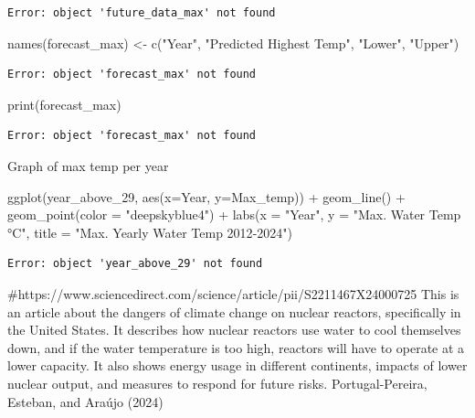 \documentclass[
  letterpaper,
  DIV=11,
  numbers=noendperiod]{scrreprt}
\newenvironment{Shaded}{\begin{snugshade}}{\end{snugshade}}
\newcommand{\AttributeTok}[1]{\textcolor[rgb]{0.40,0.45,0.13}{#1}}
\newcommand{\FunctionTok}[1]{\textcolor[rgb]{0.28,0.35,0.67}{#1}}
\newcommand{\NormalTok}[1]{\textcolor[rgb]{0.00,0.23,0.31}{#1}}
\newcommand{\OtherTok}[1]{\textcolor[rgb]{0.00,0.23,0.31}{#1}}
\newcommand{\SpecialCharTok}[1]{\textcolor[rgb]{0.37,0.37,0.37}{#1}}
\newcommand{\StringTok}[1]{\textcolor[rgb]{0.13,0.47,0.30}{#1}}
\begin{document}
\begin{verbatim}
Error: object 'future_data_max' not found
\end{verbatim}

\begin{Shaded}
\begin{Highlighting}[]
\FunctionTok{names}\NormalTok{(forecast\_max) }\OtherTok{\textless{}{-}} \FunctionTok{c}\NormalTok{(}\StringTok{"Year"}\NormalTok{, }\StringTok{"Predicted Highest Temp"}\NormalTok{, }\StringTok{"Lower"}\NormalTok{, }\StringTok{"Upper"}\NormalTok{)}
\end{Highlighting}
\end{Shaded}

\begin{verbatim}
Error: object 'forecast_max' not found
\end{verbatim}

\begin{Shaded}
\begin{Highlighting}[]
\FunctionTok{print}\NormalTok{(forecast\_max)}
\end{Highlighting}
\end{Shaded}

\begin{verbatim}
Error: object 'forecast_max' not found
\end{verbatim}

Graph of max temp per year

\begin{Shaded}
\begin{Highlighting}[]
\FunctionTok{ggplot}\NormalTok{(year\_above\_29, }\FunctionTok{aes}\NormalTok{(}\AttributeTok{x=}\NormalTok{Year, }\AttributeTok{y=}\NormalTok{Max\_temp)) }\SpecialCharTok{+}
  \FunctionTok{geom\_line}\NormalTok{() }\SpecialCharTok{+}
  \FunctionTok{geom\_point}\NormalTok{(}\AttributeTok{color =} \StringTok{"deepskyblue4"}\NormalTok{) }\SpecialCharTok{+}
  \FunctionTok{labs}\NormalTok{(}\AttributeTok{x =} \StringTok{"Year"}\NormalTok{, }\AttributeTok{y =} \StringTok{"Max. Water Temp °C"}\NormalTok{, }\AttributeTok{title =} \StringTok{"Max. Yearly Water Temp 2012{-}2024"}\NormalTok{) }
\end{Highlighting}
\end{Shaded}

\begin{verbatim}
Error: object 'year_above_29' not found
\end{verbatim}

\#https://www.sciencedirect.com/science/article/pii/S2211467X24000725
This is an article about the dangers of climate change on nuclear
reactors, specifically in the United States. It describes how nuclear
reactors use water to cool themselves down, and if the water temperature
is too high, reactors will have to operate at a lower capacity. It also
shows energy usage in different continents, impacts of lower nuclear
output, and measures to respond for future risks. Portugal-Pereira,
Esteban, and Araújo (2024)
\end{document}
